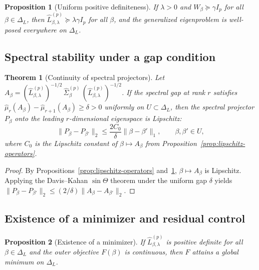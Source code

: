 \documentclass[11pt]{article}
\newtheorem{theorem}{Theorem}
\newtheorem{proposition}{Proposition}[section]
\theoremstyle{remark}
\begin{document}
\begin{proposition}[Uniform positive definiteness]
\label{prop:uniform-pd}
If $\lambda>0$ and $W_\beta\succeq\gamma I_p$ for all $\beta\in\Delta_L$, then $\widehat{L}^{(p)}_{\beta,\lambda}\succeq\lambda\gamma I_p$ for all $\beta$, and the generalized eigenproblem is well-posed everywhere on $\Delta_L$.
\end{proposition}

\subsection{Spectral stability under a gap condition}
\label{subsec:theory-stability}

\begin{theorem}[Continuity of spectral projectors]
\label{thm:projector-continuity}
Let $A_\beta=(\widehat{L}^{(p)}_{\beta,\lambda})^{-1/2}\,\widehat{\Sigma}^{(p)}_\beta\,(\widehat{L}^{(p)}_{\beta,\lambda})^{-1/2}$.
If the spectral gap at rank $r$ satisfies $\widehat\mu_r(A_\beta)-\widehat\mu_{r+1}(A_\beta)\ge\delta>0$ uniformly on $U\subset\Delta_L$, then the spectral projector $P_\beta$ onto the leading $r$-dimensional eigenspace is Lipschitz:
\[
\|P_\beta-P_{\beta'}\|_2 \le \frac{2C_0}{\delta}\|\beta-\beta'\|_1,\qquad \beta,\beta'\in U,
\]
where $C_0$ is the Lipschitz constant of $\beta\mapsto A_\beta$ from Proposition~\ref{prop:lipschitz-operators}.
\end{theorem}

\begin{proof}
By Propositions~\ref{prop:lipschitz-operators} and~\ref{prop:uniform-pd}, $\beta\mapsto A_\beta$ is Lipschitz.
Applying the Davis--Kahan $\sin\Theta$ theorem under the uniform gap $\delta$ yields $\|P_\beta-P_{\beta'}\|_2\le (2/\delta)\|A_\beta-A_{\beta'}\|_2$.
\end{proof}

\subsection{Existence of a minimizer and residual control}
\label{subsec:theory-existence}

\begin{proposition}[Existence of a minimizer]
\label{prop:existence-minimizer}
If $\widehat{L}^{(p)}_{\beta,\lambda}$ is positive definite for all $\beta\in\Delta_L$ and the outer objective $F(\beta)$ is continuous, then $F$ attains a global minimum on $\Delta_L$.
\end{proposition}
\end{document}
